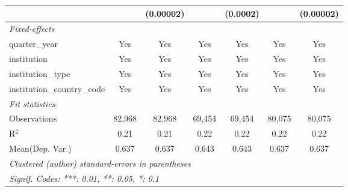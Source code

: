 \begin{tabular}{lcccccc}
                                      &               & (0.00002)     &               & (0.0002)      &               & (0.00002)\\   
   \midrule
   \emph{Fixed-effects}\\
   quarter\_year                      & Yes           & Yes           & Yes           & Yes           & Yes           & Yes\\  
   institution                        & Yes           & Yes           & Yes           & Yes           & Yes           & Yes\\  
   institution\_type                  & Yes           & Yes           & Yes           & Yes           & Yes           & Yes\\  
   institution\_country\_code         & Yes           & Yes           & Yes           & Yes           & Yes           & Yes\\  
   \midrule
   \emph{Fit statistics}\\
   Observations                       & 82,968        & 82,968        & 69,454        & 69,454        & 80,075        & 80,075\\  
   R$^2$                              & 0.21          & 0.21          & 0.22          & 0.22          & 0.22          & 0.22\\  
Mean(Dep. Var.) & 0.637 & 0.637 & 0.643 & 0.643 & 0.637 & 0.637 \\
   \midrule \midrule
   \multicolumn{7}{l}{\emph{Clustered (author) standard-errors in parentheses}}\\
   \multicolumn{7}{l}{\emph{Signif. Codes: ***: 0.01, **: 0.05, *: 0.1}}\\
\end{tabular}
\par\endgroup
